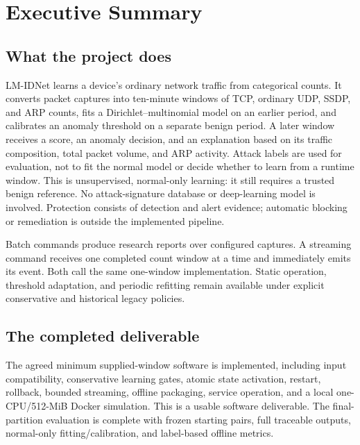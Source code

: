 \section{Executive Summary}

\subsection{What the project does}

LM-IDNet learns a device's ordinary network traffic from categorical counts.
It converts packet captures into ten-minute windows of TCP, ordinary UDP, SSDP,
and ARP counts, fits a Dirichlet--multinomial model on an earlier period, and
calibrates an anomaly threshold on a separate benign period. A later window
receives a score, an anomaly decision, and an explanation based on its traffic
composition, total packet volume, and ARP activity. Attack labels are used for
evaluation, not to fit the normal model or decide whether to learn from a runtime window.
This is unsupervised, normal-only learning: it still requires a trusted benign
reference. No attack-signature database or deep-learning model is involved.
Protection consists of detection and alert evidence; automatic blocking or
remediation is outside the implemented pipeline.

Batch commands produce research reports over configured captures. A streaming
command receives one completed count window at a time and immediately emits
its event. Both call the same one-window implementation. Static operation,
threshold adaptation, and periodic refitting remain available under explicit
conservative and historical legacy policies.

\begin{center}
\end{center}

\subsection{The completed deliverable}

The agreed minimum supplied-window software is implemented, including input
compatibility, conservative learning gates, atomic state activation, restart,
rollback, bounded streaming, offline packaging, service operation, and a local
one-CPU/512-MiB Docker simulation. This is a usable software deliverable.
The final-partition evaluation is complete with frozen starting pairs, full
traceable outputs, normal-only fitting/calibration, and label-based offline metrics.

